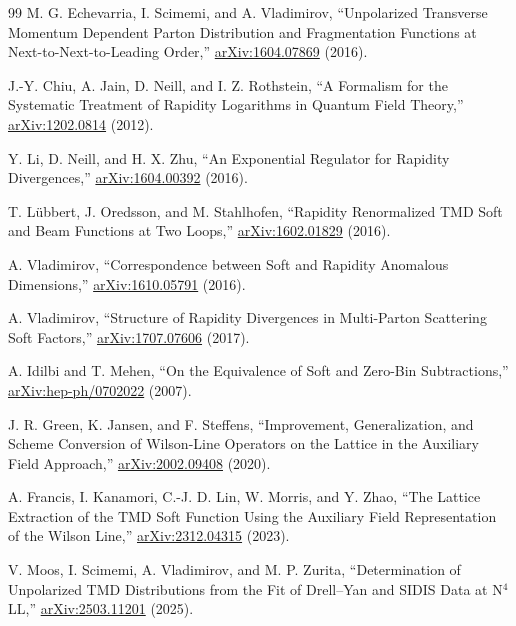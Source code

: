 \documentclass[11pt]{article}
\begin{document}
\begin{thebibliography}{99}
M. G. Echevarria, I. Scimemi, and A. Vladimirov,
``Unpolarized Transverse Momentum Dependent Parton Distribution and Fragmentation Functions at Next-to-Next-to-Leading Order,''
\href{https://arxiv.org/abs/1604.07869}{arXiv:1604.07869} (2016).

J.-Y. Chiu, A. Jain, D. Neill, and I. Z. Rothstein,
``A Formalism for the Systematic Treatment of Rapidity Logarithms in Quantum Field Theory,''
\href{https://arxiv.org/abs/1202.0814}{arXiv:1202.0814} (2012).

Y. Li, D. Neill, and H. X. Zhu,
``An Exponential Regulator for Rapidity Divergences,''
\href{https://arxiv.org/abs/1604.00392}{arXiv:1604.00392} (2016).

T. L\"ubbert, J. Oredsson, and M. Stahlhofen,
``Rapidity Renormalized TMD Soft and Beam Functions at Two Loops,''
\href{https://arxiv.org/abs/1602.01829}{arXiv:1602.01829} (2016).

A. Vladimirov,
``Correspondence between Soft and Rapidity Anomalous Dimensions,''
\href{https://arxiv.org/abs/1610.05791}{arXiv:1610.05791} (2016).

A. Vladimirov,
``Structure of Rapidity Divergences in Multi-Parton Scattering Soft Factors,''
\href{https://arxiv.org/abs/1707.07606}{arXiv:1707.07606} (2017).

A. Idilbi and T. Mehen,
``On the Equivalence of Soft and Zero-Bin Subtractions,''
\href{https://arxiv.org/abs/hep-ph/0702022}{arXiv:hep-ph/0702022} (2007).

J. R. Green, K. Jansen, and F. Steffens,
``Improvement, Generalization, and Scheme Conversion of Wilson-Line Operators on the Lattice in the Auxiliary Field Approach,''
\href{https://arxiv.org/abs/2002.09408}{arXiv:2002.09408} (2020).

A. Francis, I. Kanamori, C.-J. D. Lin, W. Morris, and Y. Zhao,
``The Lattice Extraction of the TMD Soft Function Using the Auxiliary Field Representation of the Wilson Line,''
\href{https://arxiv.org/abs/2312.04315}{arXiv:2312.04315} (2023).

V. Moos, I. Scimemi, A. Vladimirov, and M. P. Zurita,
``Determination of Unpolarized TMD Distributions from the Fit of Drell--Yan and SIDIS Data at N\(^4\)LL,''
\href{https://arxiv.org/abs/2503.11201}{arXiv:2503.11201} (2025).

\end{thebibliography}
\endgroup
\end{document}

